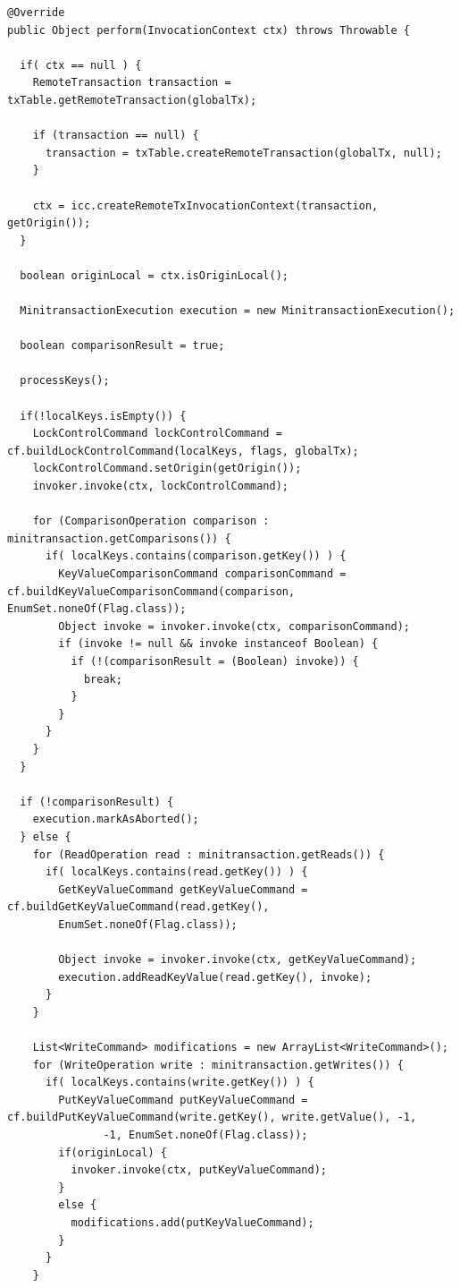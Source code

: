 \documentclass[11pt,twoside,a4paper]{book}
\begin{document}
\begin{lstlisting}[caption={Função PrepareMinitransactionCommand.perform}, label=lst:perform]
@Override
public Object perform(InvocationContext ctx) throws Throwable {

  if( ctx == null ) {
    RemoteTransaction transaction = txTable.getRemoteTransaction(globalTx);

    if (transaction == null) {
      transaction = txTable.createRemoteTransaction(globalTx, null);
    }
         
    ctx = icc.createRemoteTxInvocationContext(transaction, getOrigin());
  }
  
  boolean originLocal = ctx.isOriginLocal();
      
  MinitransactionExecution execution = new MinitransactionExecution();
      
  boolean comparisonResult = true;

  processKeys();
      
  if(!localKeys.isEmpty()) {
    LockControlCommand lockControlCommand = cf.buildLockControlCommand(localKeys, flags, globalTx);
    lockControlCommand.setOrigin(getOrigin());
    invoker.invoke(ctx, lockControlCommand);

    for (ComparisonOperation comparison : minitransaction.getComparisons()) {
      if( localKeys.contains(comparison.getKey()) ) {
        KeyValueComparisonCommand comparisonCommand = cf.buildKeyValueComparisonCommand(comparison, EnumSet.noneOf(Flag.class));
        Object invoke = invoker.invoke(ctx, comparisonCommand);
        if (invoke != null && invoke instanceof Boolean) {
          if (!(comparisonResult = (Boolean) invoke)) {
            break;
          }
        }
      }
    }
  }

  if (!comparisonResult) {
    execution.markAsAborted();
  } else {
    for (ReadOperation read : minitransaction.getReads()) {
      if( localKeys.contains(read.getKey()) ) {
        GetKeyValueCommand getKeyValueCommand = cf.buildGetKeyValueCommand(read.getKey(),
        EnumSet.noneOf(Flag.class));

        Object invoke = invoker.invoke(ctx, getKeyValueCommand);
        execution.addReadKeyValue(read.getKey(), invoke);
      }
    }

    List<WriteCommand> modifications = new ArrayList<WriteCommand>();
    for (WriteOperation write : minitransaction.getWrites()) {
      if( localKeys.contains(write.getKey()) ) {
        PutKeyValueCommand putKeyValueCommand = cf.buildPutKeyValueCommand(write.getKey(), write.getValue(), -1,
               -1, EnumSet.noneOf(Flag.class));
        if(originLocal) {
          invoker.invoke(ctx, putKeyValueCommand);
        }
        else {
          modifications.add(putKeyValueCommand);
        }
      }
    }


\end{lstlisting}
\end{document}
